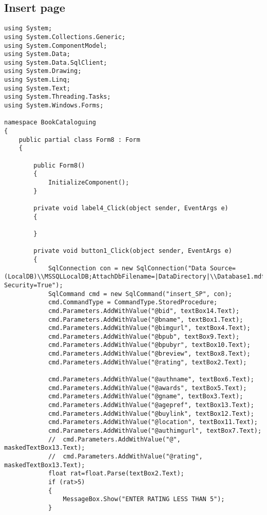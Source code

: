\subsection{Insert page}
\begin{lstlisting}
using System;
using System.Collections.Generic;
using System.ComponentModel;
using System.Data;
using System.Data.SqlClient;
using System.Drawing;
using System.Linq;
using System.Text;
using System.Threading.Tasks;
using System.Windows.Forms;

namespace BookCataloguing
{
    public partial class Form8 : Form
    {
        
        public Form8()
        {
            InitializeComponent();
        }
        
        private void label4_Click(object sender, EventArgs e)
        {

        }

        private void button1_Click(object sender, EventArgs e)
        {
            SqlConnection con = new SqlConnection("Data Source=(LocalDB)\\MSSQLLocalDB;AttachDbFilename=|DataDirectory|\\Database1.mdf;Integrated Security=True");
            SqlCommand cmd = new SqlCommand("insert_SP", con);
            cmd.CommandType = CommandType.StoredProcedure;
            cmd.Parameters.AddWithValue("@bid", textBox14.Text);
            cmd.Parameters.AddWithValue("@bname", textBox1.Text);
            cmd.Parameters.AddWithValue("@bimgurl", textBox4.Text);
            cmd.Parameters.AddWithValue("@bpub", textBox9.Text);
            cmd.Parameters.AddWithValue("@bpubyr", textBox10.Text);
            cmd.Parameters.AddWithValue("@breview", textBox8.Text);
            cmd.Parameters.AddWithValue("@rating", textBox2.Text);

            cmd.Parameters.AddWithValue("@authname", textBox6.Text);
            cmd.Parameters.AddWithValue("@awards", textBox5.Text);
            cmd.Parameters.AddWithValue("@gname", textBox3.Text);
            cmd.Parameters.AddWithValue("@agepref", textBox13.Text);
            cmd.Parameters.AddWithValue("@buylink", textBox12.Text);
            cmd.Parameters.AddWithValue("@location", textBox11.Text);
            cmd.Parameters.AddWithValue("@authimgurl", textBox7.Text);
            //  cmd.Parameters.AddWithValue("@", maskedTextBox13.Text);
            //  cmd.Parameters.AddWithValue("@rating", maskedTextBox13.Text);
            float rat=float.Parse(textBox2.Text);
            if (rat>5)
            {
                MessageBox.Show("ENTER RATING LESS THAN 5");
            }


\end{lstlisting}
